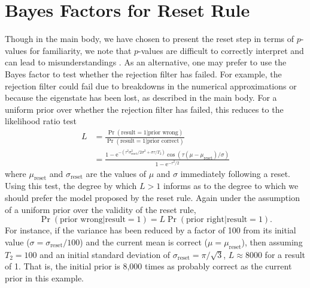 \documentclass[aps,pra,amsmath,twocolumn,amssymb,superscriptaddress]{revtex4-1}
\newcommand{\reset}{\mathrm{reset}}
\newcommand{\ee}{\mathrm{e}}
\begin{document}
\section{Bayes Factors for Reset Rule}
\label{app:bf}

Though in the main body, we have chosen to present the reset step in terms of
$p$-values for familiarity, we note that $p$-values are difficult to correctly
interpret and can lead to misunderstandings \cite{goodman_dirty_2008,hoekstra_robust_2014}. As an
alternative, one may prefer to use the Bayes factor to test whether the rejection
filter has failed. For example, the rejection filter could fail due to
breakdowns in the numerical approximations or because the eigenstate has
been lost, as described in the main body. For a uniform prior over
whether the rejection filter has failed, this reduces to the likelihood
ratio test
\begin{subequations}
    \begin{align}
        L & = \frac{\Pr(\text{result} = 1 | \text{prior wrong})}{\Pr(\text{result} = 1 | \text{prior correct})} \\
          & = \frac{                  
                  1 - \ee^{
                          - (\tau^2 \sigma_\reset^2 / 2 \sigma^2 + \sigma \tau / T_2)
                      }
                      \cos \left(
                        \tau \left(\mu -\mu _\reset \right) / \sigma
                      \right)
              }{
                  1-\ee^{-\tau^2 / 2}
              }
    \end{align}
\end{subequations}
where $\mu_\reset$ and $\sigma_\reset$ are the values of $\mu$ and $\sigma$
immediately following a reset. Using this test, the degree by which $L > 1$
informs as to the degree to which we should prefer the model proposed by the
reset rule. Again under the assumption of a uniform prior over the
validity of the reset rule,
\begin{equation}
    \Pr(\text{prior wrong} | \text{result} = 1) = L \Pr(\text{prior right} | \text{result} = 1).
\end{equation}
For instance, if the variance has been reduced by a factor of 100 from
its initial value ($\sigma = \sigma_\reset / 100$) and the current mean is
correct ($\mu = \mu_\reset$), then assuming $T_2 = 100$ and an initial standard
deviation of $\sigma_\reset = \pi / \sqrt{3}$, $L\approx8000$ for a result of
1. That is, the initial prior is 8,000 times as probably correct as the current
prior in this example.
\end{document}
